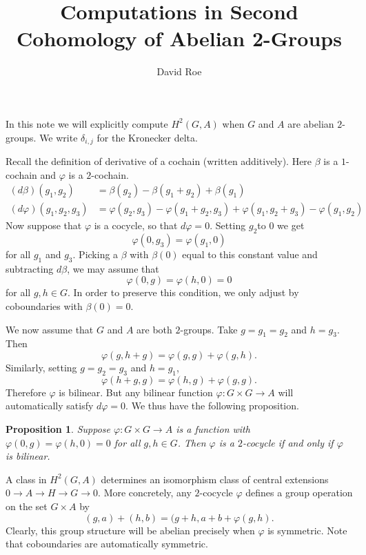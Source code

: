 \documentclass{article}
\title{Computations in Second Cohomology of Abelian 2-Groups}
\author{David Roe}
\theoremstyle{plain}
\newtheorem{proposition}{Proposition}
\begin{document}
\maketitle

In this note we will explicitly compute $H^2(G, A)$ when $G$ and $A$ are abelian $2$-groups.  We write $\delta_{i,j}$ for the Kronecker delta.

Recall the definition of derivative of a cochain (written additively).  Here $\beta$ is a $1$-cochain and $\varphi$ is a $2$-cochain.
\begin{align}
(d\beta)(g_1, g_2) &= \beta(g_2) - \beta(g_1 + g_2) + \beta(g_1)\\
(d\varphi)(g_1,g_2,g_3) &= \varphi(g_2,g_3) - \varphi(g_1 + g_2, g_3) + \varphi(g_1, g_2 + g_3) - \varphi(g_1, g_2)
\end{align}
Now suppose that $\varphi$ is a cocycle, so that $d\varphi = 0$.  Setting $g_2$to $0$ we get
\[
\varphi(0, g_3) = \varphi(g_1, 0)
\]
for all $g_1$ and $g_3$.  Picking a $\beta$ with $\beta(0)$ equal to this constant value and subtracting $d\beta$, we may assume that
\[
\varphi(0, g) = \varphi(h, 0) = 0
\]
for all $g, h \in G$.  In order to preserve this condition, we only adjust by coboundaries with $\beta(0) = 0$.

We now assume that $G$ and $A$ are both $2$-groups.  Take $g = g_1 = g_2$ and $h = g_3$.  Then
\[
\varphi(g, h + g) = \varphi(g, g) + \varphi(g, h).
\]
Similarly, setting $g = g_2 = g_3$ and $h = g_1$,
\[
\varphi(h + g, g) = \varphi(h, g) + \varphi(g, g).
\]
Therefore $\varphi$ is bilinear.  But any bilinear function $\varphi : G \times G \to A$ will automatically satisfy $d\varphi = 0$.  We thus have the following proposition.

\begin{proposition}
Suppose $\varphi : G \times G \to A$ is a function with $\varphi(0, g) = \varphi(h, 0) = 0$ for all $g, h \in G$.  Then $\varphi$ is a $2$-cocycle if and only if $\varphi$ is bilinear.
\end{proposition}

A class in $H^2(G, A)$ determines an isomorphism class of central extensions $0 \to A \to H \to G \to 0$.  More concretely, any $2$-cocycle $\varphi$ defines a group operation on the set $G \times A$ by 
\begin{equation} \label{eq:cocycle-action}
(g, a) + (h, b) = (g + h, a + b + \varphi(g, h).
\end{equation}
Clearly, this group structure will be abelian precisely when $\varphi$ is symmetric.  Note that coboundaries are automatically symmetric.
\end{document}
